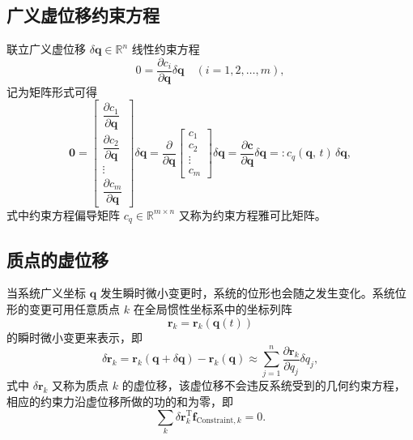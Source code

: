 \subsection{广义虚位移约束方程}

联立广义虚位移 $\delta\boldsymbol{q} \in \mathbb{R}^n$ 线性约束方程
\begin{equation*}
0 = \frac{\partial c_i}{\partial \boldsymbol{q}} \delta\boldsymbol{q} \quad (i = 1, 2, \ldots, m),
\end{equation*}
记为矩阵形式可得
\begin{equation}\label{eq:2.4}
\boldsymbol{0} = \begin{bmatrix} \dfrac{\partial c_1}{\partial \boldsymbol{q}} \\ \dfrac{\partial c_2}{\partial \boldsymbol{q}} \\ \vdots \\ \dfrac{\partial c_m}{\partial \boldsymbol{q}} \end{bmatrix} \!\delta\boldsymbol{q} = \frac{\partial}{\partial \boldsymbol{q}} \!\begin{bmatrix} c_1 \\ c_2 \\ \vdots \\ c_m \end{bmatrix} \!\delta\boldsymbol{q} = \frac{\partial \boldsymbol{c}}{\partial \boldsymbol{q}} \delta\boldsymbol{q} =: c_q(\boldsymbol{q},\, t)\,\delta\boldsymbol{q},
\end{equation}
式中约束方程偏导矩阵 $c_q \in \mathbb{R}^{m \times n}$ 又称为约束方程雅可比矩阵。

\subsection{质点的虚位移}

当系统广义坐标 $\boldsymbol{q}$ 发生瞬时微小变更时，系统的位形也会随之发生变化。系统位形的变更可用任意质点 $k$ 在全局惯性坐标系中的坐标列阵
\begin{equation*}
\boldsymbol{r}_k = \boldsymbol{r}_k(\boldsymbol{q}(t))
\end{equation*}
的瞬时微小变更来表示，即
\begin{equation}\label{eq:2.5}
\delta\boldsymbol{r}_k = \boldsymbol{r}_k(\boldsymbol{q} + \delta\boldsymbol{q}) - \boldsymbol{r}_k(\boldsymbol{q}) \approx \sum_{j=1}^{n} \frac{\partial \boldsymbol{r}_k}{\partial q_j} \delta q_j,
\end{equation}
式中 $\delta\boldsymbol{r}_k$ 又称为质点 $k$ 的虚位移，该虚位移不会违反系统受到的几何约束方程，相应的约束力沿虚位移所做的功的和为零，即
\begin{equation}\label{eq:2.6}
\sum_{k} \delta\boldsymbol{r}_k^{\mathrm{T}} \boldsymbol{f}_{\text{Constraint},k} = 0.
\end{equation}

